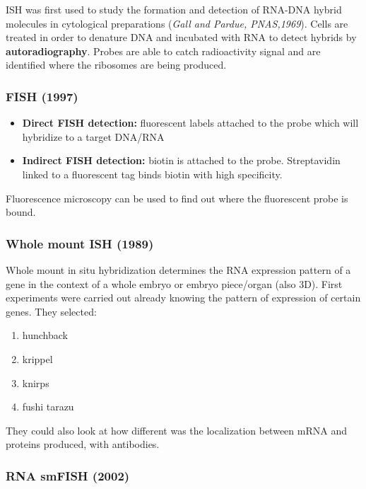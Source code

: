 ISH was first used to study the formation and detection of RNA-DNA
hybrid molecules in cytological preparations (\emph{Gall and Pardue,
PNAS,1969}).  Cells are treated in order to denature DNA and
incubated with RNA to detect hybrids by \textbf{autoradiography}. Probes
are able to catch radioactivity signal and are identified where the
ribosomes are being produced.

\hypertarget{fish-1997}{%
\subsubsection{FISH (1997)}\label{fish-1997}}

\begin{itemize}
\tightlist
\item
  \textbf{Direct FISH detection:} fluorescent labels attached to the
  probe which will hybridize to a target DNA/RNA
\item
  \textbf{Indirect FISH detection:} biotin is attached to the probe.
  Streptavidin linked to a fluorescent tag binds biotin with high
  specificity.
\end{itemize}

Fluorescence microscopy can be used to find out where the fluorescent
probe is bound.

\hypertarget{whole-mount-ish-1989}{%
\subsubsection{\texorpdfstring{\textbf{Whole mount ISH
(1989)}}{Whole mount ISH (1989)}}\label{whole-mount-ish-1989}}

Whole mount in situ hybridization determines the RNA expression pattern
of a gene in the context of a whole embryo or embryo piece/organ (also
3D). First experiments were carried out already knowing the pattern of
expression of certain genes. They selected:

\begin{enumerate}
\def\labelenumi{\arabic{enumi}.}
\tightlist
\item
  hunchback
\item
  krippel
\item
  knirps
\item
  fushi tarazu
\end{enumerate}

They could also look at how different was the localization between mRNA
and proteins produced, with antibodies.

\hypertarget{rna-smfish-2002}{%
\subsubsection{\texorpdfstring{RNA \textbf{smFISH
(2002)}}{RNA smFISH (2002)}}\label{rna-smfish-2002}}

